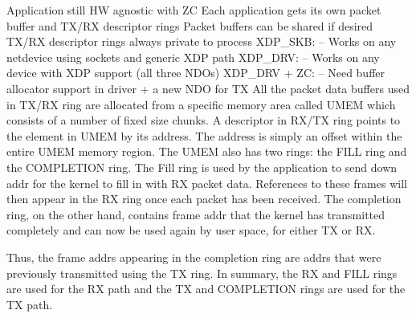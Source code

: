 \documentclass[10pt]{sigplanconf}
\begin{document}
Application still HW agnostic with ZC
Each application gets its own packet buffer and TX/RX descriptor rings
Packet buffers can be shared if desired
  TX/RX descriptor rings always private to process
XDP\_SKB:
– Works on any netdevice using sockets and generic XDP path
XDP\_DRV:
– Works on any device with XDP support (all three NDOs)
XDP\_DRV + ZC:
– Need buffer allocator support in driver + a new NDO for TX
All the packet data buffers used in TX/RX ring are allocated from a specific
memory area called UMEM which consists of a number of fixed size chunks.
A descriptor in RX/TX ring points to the element in UMEM by its address.
The address is simply an offset within the entire UMEM memory region.
The UMEM also has two rings: the FILL ring and the COMPLETION ring.
The Fill ring is used by the application to send down addr for the kernel
to fill in with RX packet data. References to these frames will then
appear in the RX ring once each packet has been received. The 
completion ring, on the other hand, contains frame addr that the 
kernel has transmitted completely and can now be used again by user
space, for either TX or RX. 

Thus, the frame addrs appearing in the 
completion ring are addrs that were previously transmitted using the 
TX ring. In summary, the RX and FILL rings are used for the RX path
and the TX and COMPLETION rings are used for the TX path.
\end{document}
